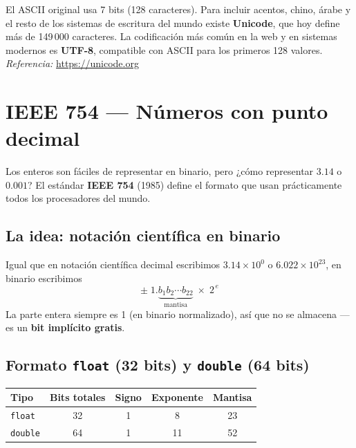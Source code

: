 \documentclass[12pt, oneside]{article}
\begin{document}
\begin{tecnico}
  El ASCII original usa 7 bits (128 caracteres). Para incluir acentos,
  chino, árabe y el resto de los sistemas de escritura del mundo existe
  \textbf{Unicode}, que hoy define más de 149\,000 caracteres.
  La codificación más común en la web y en sistemas modernos es
  \textbf{UTF-8}, compatible con ASCII para los primeros 128 valores.\\
  \textit{Referencia:} \url{https://unicode.org}
\end{tecnico}

\section{IEEE 754 — Números con punto decimal}

Los enteros son fáciles de representar en binario, pero ¿cómo representar
$3.14$ o $0.001$? El estándar \textbf{IEEE 754} (1985) define el formato
que usan prácticamente todos los procesadores del mundo.

\subsection{La idea: notación científica en binario}

Igual que en notación científica decimal escribimos
$3.14 \times 10^0$ o $6.022 \times 10^{23}$,
en binario escribimos
\[
  \pm\; 1.\underbrace{b_1 b_2 \cdots b_{22}}_{\text{mantisa}} \;\times\; 2^{\,e}
\]
La parte entera siempre es 1 (en binario normalizado), así que no se
almacena — es un \textbf{bit implícito gratis}.

\subsection{Formato \texttt{float} (32 bits) y \texttt{double} (64 bits)}

\begin{center}
\begin{tabular}{lcccc}
  \toprule
  \textbf{Tipo} & \textbf{Bits totales} & \textbf{Signo} &
  \textbf{Exponente} & \textbf{Mantisa} \\
  \midrule
  \texttt{float}  & 32 & 1 & 8  & 23 \\
  \texttt{double} & 64 & 1 & 11 & 52 \\
  \bottomrule
\end{tabular}
\end{center}
\end{document}
